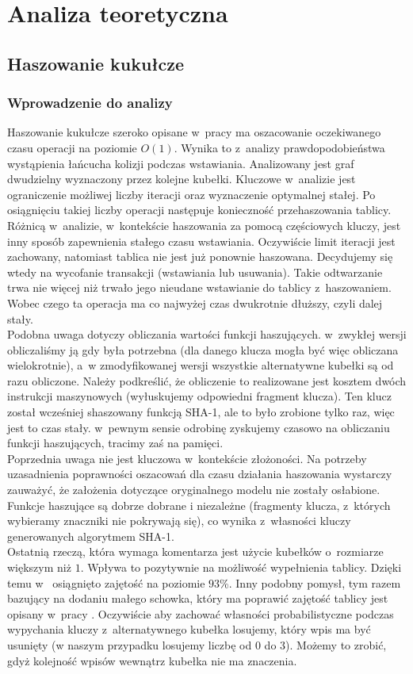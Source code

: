 \documentclass[declaration,shortabstract,masc]{iithesis}
\begin{document}
	\chapter{Analiza teoretyczna}
		\section{Haszowanie kukułcze}
			\subsection{Wprowadzenie do analizy}
				Haszowanie kukułcze szeroko opisane w~pracy \cite{CH} ma oszacowanie oczekiwanego czasu operacji na poziomie $O(1)$. Wynika to z~analizy prawdopodobieństwa wystąpienia łańcucha kolizji podczas wstawiania. Analizowany jest graf dwudzielny wyznaczony przez kolejne kubełki. Kluczowe w~analizie jest ograniczenie możliwej liczby iteracji oraz wyznaczenie optymalnej stałej. Po osiągnięciu takiej liczby operacji następuje konieczność przehaszowania tablicy.\\
				\indent Różnicą w~analizie, w~kontekście haszowania za pomocą częściowych kluczy, jest inny sposób zapewnienia stałego czasu wstawiania. Oczywiście limit iteracji jest zachowany, natomiast tablica nie jest już ponownie haszowana. Decydujemy się wtedy na wycofanie transakcji (wstawiania lub usuwania). Takie odtwarzanie trwa nie więcej niż trwało jego nieudane wstawianie do tablicy z~haszowaniem. Wobec czego ta operacja ma co najwyżej czas dwukrotnie dłuższy, czyli dalej stały.\\
				\indent Podobna uwaga dotyczy obliczania wartości funkcji haszujących. w~zwykłej wersji obliczaliśmy ją gdy była potrzebna (dla danego klucza mogła być więc obliczana wielokrotnie), a~w zmodyfikowanej wersji wszystkie alternatywne kubełki są od razu obliczone. Należy podkreślić, że obliczenie to realizowane jest kosztem dwóch instrukcji maszynowych (wyłuskujemy odpowiedni fragment klucza). Ten klucz został wcześniej shaszowany funkcją SHA-1, ale to było zrobione tylko raz, więc jest to czas stały. w~pewnym sensie odrobinę zyskujemy czasowo na obliczaniu funkcji haszujących, tracimy zaś na pamięci.\\
				\indent Poprzednia uwaga nie jest kluczowa w~kontekście złożoności. Na potrzeby uzasadnienia poprawności oszacowań dla czasu działania haszowania wystarczy zauważyć, że założenia dotyczące oryginalnego modelu nie zostały osłabione. Funkcje haszujące są dobrze dobrane i niezależne (fragmenty klucza, z~których wybieramy znaczniki nie pokrywają się), co wynika z~własności kluczy generowanych algorytmem SHA-1.\\
				\indent Ostatnią rzeczą, która wymaga komentarza jest użycie kubełków o~rozmiarze większym niż $1$. Wpływa to pozytywnie na możliwość wypełnienia tablicy. Dzięki temu w~\cite{SILT} osiągnięto zajętość na poziomie $93$\%. Inny podobny pomysł, tym razem bazujący na dodaniu małego schowka, który ma poprawić zajętość tablicy jest opisany w~pracy \cite{CHwS}. Oczywiście aby zachować własności probabilistyczne podczas wypychania kluczy z~alternatywnego kubełka losujemy, który wpis ma być usunięty (w naszym przypadku losujemy liczbę od $0$ do $3$). Możemy to zrobić, gdyż kolejność wpisów wewnątrz kubełka nie ma znaczenia.
\end{document}
